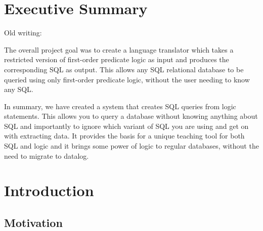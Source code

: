\documentclass[a4paper, 11pt]{article}
\begin{document}
\renewcommand{\contentsname}{\huge Contents \vspace{1cm}}
\tableofcontents
\clearpage

\setlength{\parskip}{0.3cm} \setlength{\parindent}{0cm}

\section{Executive Summary}
  Old writing:

  The overall project goal was to create a language translator which
  takes a restricted version of first-order predicate logic as input and
  produces the corresponding SQL as output. This allows any SQL relational
  database to be queried using only first-order predicate logic, without the
  user needing to know any SQL.

  In summary, we have created a system that creates SQL queries from logic 
  statements. This allows you to query a database without knowing anything
  about SQL and importantly to ignore which variant of SQL you
  are using and get on with extracting data. It provides the basis for a
  unique teaching tool for both SQL and logic and it brings some power
  of logic to regular databases, without the need to migrate to datalog.

\section{Introduction}


  \subsection{Motivation}
\end{document}
